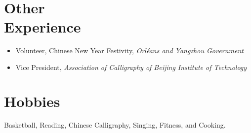 \documentclass{mycv}
\begin{document}
\vspace{-0.5em}

\section{Other \\ Experience}

\begin{itemize}
  \itemsep 0em
  \item  Volunteer, Chinese New Year Festivity, \emph{Orl\'eans and Yangzhou Government} 
  \item Vice President, \emph{Association of Calligraphy of Beijing Institute of Technology} 
\end{itemize}

\section{Hobbies}

Basketball, Reading, Chinese Calligraphy, Singing, Fitness, and Cooking.
\end{document}
